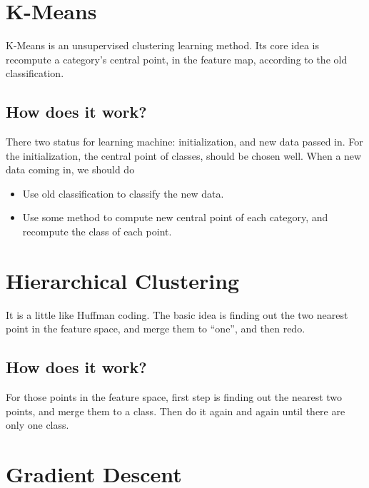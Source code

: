 \documentclass{article}
\begin{document}
\section{K-Means}
\label{sec:kmeans}

K-Means is an unsupervised clustering learning method. Its core idea is recompute a category's central point, in the feature map,  according
to the old classification.

\subsection{How does it work?}
\label{sec:kmeans:how}

There two status for learning machine: initialization, and new data passed in.
For the initialization, the central point of classes, should be chosen well.
When a new data coming in, we should do
\begin{itemize}
	\item Use old classification to classify the new data.
	\item Use some method to compute new central point of each category, and recompute the class of each point.
\end{itemize}

\section{Hierarchical Clustering}
\label{sec:hc}

It is a little like Huffman coding. The basic idea is finding out the two nearest point in the feature space, and merge them to ``one'', and then redo.

\subsection{How does it work?}
\label{sec:hc:how}

For those points in the feature space, first step is finding out the nearest two points, and merge them to a class.
Then do it again and again until there are only one class. 

\section{Gradient Descent}
\label{sec:gd}
\end{document}
